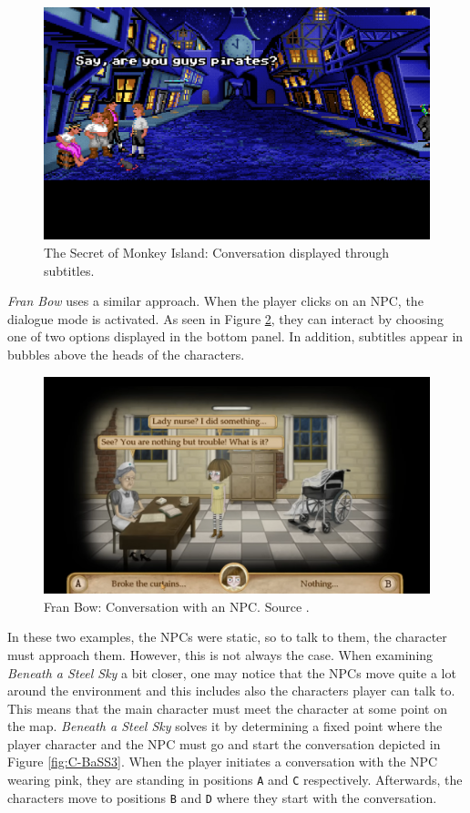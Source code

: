 \begin{figure}[H]
\centering
\includegraphics[width=.85\linewidth]{img/D-TSoMI2.png}
\caption{The Secret of Monkey Island: Conversation displayed through subtitles.}
\label{fig:D-TSoMI2}
\end{figure}

\textit{Fran Bow} uses a similar approach. When the player clicks on an NPC, the dialogue mode is activated. As seen in Figure \ref{fig:D-FranBow}, they can interact by choosing one of two options displayed in the bottom panel. In addition, subtitles appear in bubbles above the heads of the characters. 

\begin{figure}[H]
\centering
\includegraphics[width=.8\linewidth]{img/D-FB.png}
\caption{Fran Bow: Conversation with an NPC. Source \cite{FranBow}.}
\label{fig:D-FranBow}
\end{figure}

In these two examples, the NPCs were static, so to talk to them, the character must approach them. However, this is not always the case. When examining \textit{Beneath a Steel Sky} a bit closer, one may notice that the NPCs move quite a lot around the environment and this includes also the characters player can talk to. This means that the main character must meet the character at some point on the map. \textit{Beneath a Steel Sky} solves it by determining a fixed point where the player character and the NPC must go and start the conversation depicted in Figure \ref{fig:C-BaSS3}. When the player initiates a conversation with the NPC wearing pink, they are standing in positions \texttt{A} and \texttt{C} respectively. Afterwards, the characters move to positions \texttt{B} and \texttt{D} where they start with the conversation.

